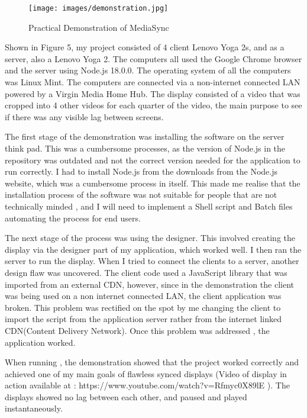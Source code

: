 \documentclass{article}
\begin{document}
\begin{figure}[h]
    \centering
    \texttt{[image: images/demonstration.jpg]}
    \caption{Practical Demonstration of MediaSync}
    \label{fig:my_label}
\end{figure}

Shown in Figure 5, my project consisted of 4 client Lenovo Yoga 2s, and as a server, also a Lenovo Yoga 2. The computers all used the Google Chrome browser and the server using Node.js 18.0.0. The operating system of all the computers was Linux Mint. The computers are connected via a non-internet connected LAN powered by a Virgin Media Home Hub. The display consisted of a video that was cropped into 4 other videos for each quarter of the video, the main purpose to see if there was any visible lag between screens. 

The first stage of the demonstration was installing the software on the server think pad. This was a cumbersome processes, as the version of Node.js in the repository was outdated and not the correct version needed for the application to run correctly. I had to install Node.js from the downloads from the Node.js website, which was a cumbersome process in itself. This made me realise that the installation process of the software was not suitable for people that are not technically minded , and I will need to implement a Shell script and Batch files automating the process for end users.

The next stage of the process was using the designer. This involved creating the display via the designer part of my application, which worked well. I then ran the server to run the display. When I tried to connect the clients to a server, another design flaw was uncovered. The client code used a JavaScript library that was imported from an external CDN, however, since in the demonstration the client was being used on a non internet connected LAN, the client application was broken. This problem was rectified on the spot by me changing the client to import the script from the application server rather from the internet linked CDN(Content Delivery Network). Once this problem was addressed , the application worked.

When running , the demonstration showed that the project worked correctly and achieved one of my main goals of flawless synced displays (Video of display in action available at : https://www.youtube.com/watch?v=Rfmyc0X89lE ). The displays showed no lag between each other, and paused and played instantaneously.
\end{document}
